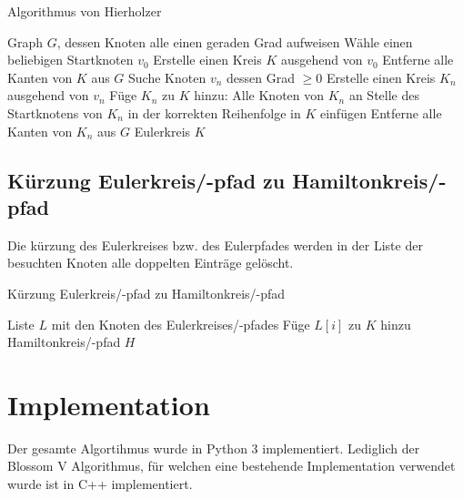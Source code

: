 \documentclass[11pt,a4paper]{article}
\begin{document}
\begin{algorithm}[H]
    \renewcommand{\algorithmicrequire}{\textbf{Eingabe:}}
    \renewcommand{\algorithmicensure}{\textbf{Ausgabe:}}
    \caption{Algorithmus von Hierholzer}

    \begin{algorithmic}[1]
    \REQUIRE Graph $G$, dessen Knoten alle einen geraden Grad aufweisen
        \STATE Wähle einen beliebigen Startknoten $v_0$
        \STATE Erstelle einen Kreis $K$ ausgehend von $v_0$
        \STATE Entferne alle Kanten von $K$ aus $G$
            \STATE Suche Knoten $v_n$ dessen Grad $\ge 0$
            \STATE Erstelle einen Kreis $K_n$ ausgehend von $v_n$
            \STATE Füge $K_n$ zu $K$ hinzu: Alle Knoten von $K_n$ an Stelle des Startknotens von $K_n$ in der korrekten Reihenfolge in $K$ einfügen
            \STATE Entferne alle Kanten von $K_n$ aus $G$
        \ENDWHILE
    \ENSURE Eulerkreis $K$
    \end{algorithmic}
\end{algorithm}



\subsection{Kürzung Eulerkreis/-pfad zu Hamiltonkreis/-pfad}
Die kürzung des Eulerkreises bzw. des Eulerpfades werden in der Liste der besuchten Knoten alle doppelten Einträge gelöscht.

\begin{algorithm}[H]
    \renewcommand{\algorithmicrequire}{\textbf{Eingabe:}}
    \renewcommand{\algorithmicensure}{\textbf{Ausgabe:}}
    \caption{Kürzung Eulerkreis/-pfad zu Hamiltonkreis/-pfad}

    \begin{algorithmic}[1]
    \REQUIRE Liste $L$ mit den Knoten des Eulerkreises/-pfades 
            \STATE Füge $L[i]$ zu $K$ hinzu
        \ENDIF
    \ENDFOR
    \ENSURE Hamiltonkreis/-pfad $H$
    \end{algorithmic}
\end{algorithm}

\newpage
\section{Implementation}
Der gesamte Algortihmus wurde in Python 3 implementiert. Lediglich der Blossom V Algorithmus, für welchen eine bestehende Implementation verwendet wurde ist in C++ implementiert.
\end{document}
